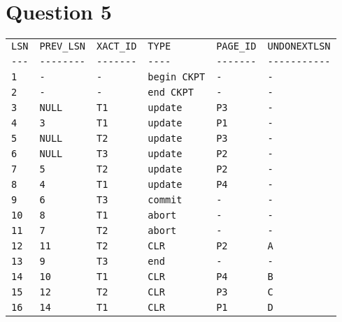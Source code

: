 \documentclass{article}
\begin{document}
\section{Question 5}

\begin{table}[h]
    \centering
    \begin{tabular}{llllll}
        \verb|LSN| & \verb|PREV_LSN| & \verb|XACT_ID| & \verb|TYPE| & \verb|PAGE_ID| & \verb|UNDONEXTLSN| \\
        \verb|---| & \verb|--------| & \verb|-------| & \verb|----| & \verb|-------| & \verb|-----------| \\
        \verb|1| & \verb|-| & \verb|-| & \verb|begin CKPT| & \verb|-| & \verb|-| \\
        \verb|2| & \verb|-| & \verb|-| & \verb|end CKPT| & \verb|-| & \verb|-| \\
        \verb|3| & \verb|NULL| & \verb|T1| & \verb|update| & \verb|P3| & \verb|-| \\
        \verb|4| & \verb|3| & \verb|T1| & \verb|update| & \verb|P1| & \verb|-| \\
        \verb|5| & \verb|NULL| & \verb|T2| & \verb|update| & \verb|P3| & \verb|-| \\
        \verb|6| & \verb|NULL| & \verb|T3| & \verb|update| & \verb|P2| & \verb|-| \\
        \verb|7| & \verb|5| & \verb|T2| & \verb|update| & \verb|P2| & \verb|-| \\
        \verb|8| & \verb|4| & \verb|T1| & \verb|update| & \verb|P4| & \verb|-| \\
        \verb|9| & \verb|6| & \verb|T3| & \verb|commit| & \verb|-| & \verb|-| \\
        \verb|10| & \verb|8| & \verb|T1| & \verb|abort| & \verb|-| & \verb|-| \\
        \verb|11| & \verb|7| & \verb|T2| & \verb|abort| & \verb|-| & \verb|-| \\
        \verb|12| & \verb|11| & \verb|T2| & \verb|CLR| & \verb|P2| & \verb|A| \\
        \verb|13| & \verb|9| & \verb|T3| & \verb|end| & \verb|-| & \verb|-| \\
        \verb|14| & \verb|10| & \verb|T1| & \verb|CLR| & \verb|P4| & \verb|B| \\
        \verb|15| & \verb|12| & \verb|T2| & \verb|CLR| & \verb|P3| & \verb|C| \\
        \verb|16| & \verb|14| & \verb|T1| & \verb|CLR| & \verb|P1| & \verb|D| \\
    \end{tabular}
\end{table}
\end{document}
